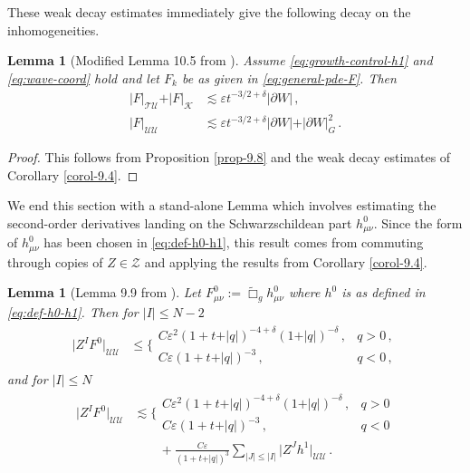 \documentclass[11pt, a4paper]{amsart}
\numberwithin{equation}{section}
\newtheorem{lemma}[theorem]{Lemma}
\numberwithin{theorem}{section}
\newcommand{\p}{\partial}
\newcommand{\mn}{{\mu \nu}}
\newcommand{\tbox}{\widetilde{\Box}}
\newcommand{\UU}{{\mathcal{U} \mathcal{U}}}
\newcommand{\TU}{{\mathcal{T} \mathcal{U}}}
\newcommand{\K}{\mathcal{K}}
\newcommand{\qv}{\vert q \vert}
\newcommand{\I}{\vert I \vert}
\newcommand{\J}{\vert J \vert}
\begin{document}
These weak decay estimates immediately give the following decay on the inhomogeneities. 
\begin{lemma}[Modified Lemma 10.5 from \cite{LR:04}] \label{lemma-10.5}
Assume \eqref{eq:growth-control-h1} and \eqref{eq:wave-coord} hold and let $F_k$ be as given in \eqref{eq:general-pde-F}. Then
\begin{align*}
\vert F \vert_\TU + \vert F \vert_\K & \lesssim  \varepsilon t^{-3/2 + \delta} \vert \p W \vert \,, \\
\vert F \vert_\UU &\lesssim  \varepsilon  t^{-3/2 + \delta} \vert \p W \vert +  \vert \p W \vert_G^2\,.
\end{align*}
\end{lemma}
\begin{proof}
This follows from Proposition \ref{prop-9.8} and the weak decay estimates of Corollary \ref{corol-9.4}.
\end{proof}

We end this section with a stand-alone Lemma which involves estimating the second-order derivatives landing on the Schwarzschildean part $h^0_\mn$. Since the form of $h^0_\mn$ has been chosen in \eqref{eq:def-h0-h1}, this result comes from commuting through copies of $Z \in \mathcal{Z}$ and applying the results from Corollary \ref{corol-9.4}.  
\begin{lemma}[Lemma 9.9 from \cite{LR:04}] \label{lemma-9.9}
Let $F^0_\mn := \tbox_g h^0_\mn$ where $h^0$ is as defined in \eqref{eq:def-h0-h1}. Then for $\I \leq N-2$
\begin{align*}
\vert Z^I F^0 \vert_{\mathcal{U} \mathcal{U}} & \leq \Bigg\lbrace \begin{array}{ll}
C \varepsilon^2 (1+t+\qv)^{-4+\delta} (1+\qv)^{-\delta} \,, & q >0 \,,  \\
C \varepsilon (1+t+\qv)^{-3} \,, & q <0 \,,
\end{array} 
\end{align*}
and for $\I \leq N$
\begin{align*}
\vert Z^I F^0 \vert_\UU & \lesssim \Bigg\lbrace \begin{array}{ll}
 C \varepsilon^2 (1+t+\qv)^{-4+\delta} (1+\qv)^{-\delta} \,, & q >0  \\
C \varepsilon (1+t+\qv)^{-3} \,, & q <0 
\end{array} \\
& \qquad + \frac{C \varepsilon}{(1+t+\qv)^{3}} \sum_{\J \leq \I} \vert Z^J h^1 \vert_\UU \,.
\end{align*}
\end{lemma}
\end{document}
